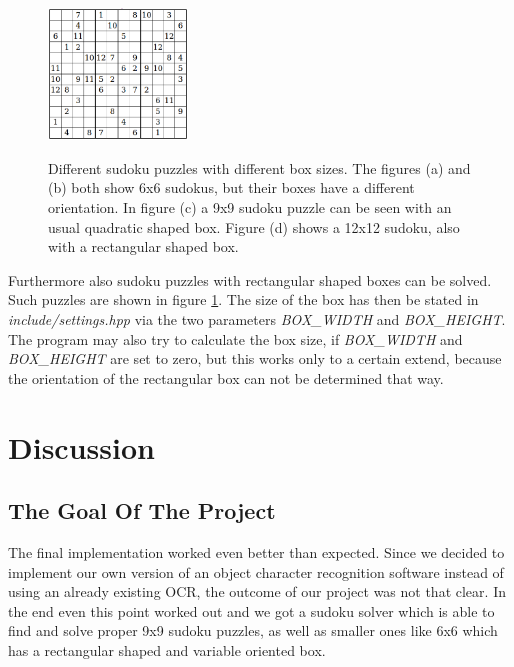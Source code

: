\documentclass[
a4paper,     %
12pt         %
]{scrartcl}  %
\begin{document}
\begin{figure}[!bhp]
\begin{center}
\begin{minipage}[h]{3.8cm}
       \label{fig:9x9}
       \subcaption{}
     \end{minipage}
     \begin{minipage}[h]{3.9cm}
       \includegraphics[height=3.5cm]{imgs/solver_12x12.png}
       \label{fig:12x12}
       \subcaption{}
     \end{minipage}     
     \caption[Different sudoku puzzles with different box sizes]{\scriptsize{Different sudoku puzzles with different box sizes.
       The figures (a) and (b) both show 6x6 sudokus, but their boxes have a different orientation. In figure (c) a 9x9 sudoku
       puzzle can be seen with an usual quadratic shaped box. Figure (d) shows a 12x12 sudoku, also with a rectangular shaped box.}}
     \label{fig:boxshapes}
   \end{center}
\end{figure} 
Furthermore also sudoku puzzles with rectangular shaped boxes can be solved. Such puzzles are shown in figure \ref{fig:boxshapes}.
The size of the box has then be stated in \emph{include/settings.hpp} via the two parameters \emph{BOX\_WIDTH} and \emph{BOX\_HEIGHT}. The 
program may also try to calculate the box size, if \emph{BOX\_WIDTH} and \emph{BOX\_HEIGHT} are set to zero, but this works only to a 
certain extend, because the orientation of the rectangular box can not be determined that way.

\section{Discussion}

\subsection{The Goal Of The Project}
The final implementation worked even better than expected. Since we decided to implement our own version of an object character recognition 
software instead of using an already existing OCR, the outcome of our project was not that clear. In the end even this point worked out and
we got a sudoku solver which is able to find and solve proper 9x9 sudoku puzzles, as well as smaller ones like 6x6 which has a rectangular
shaped and variable oriented box.
\end{document}
